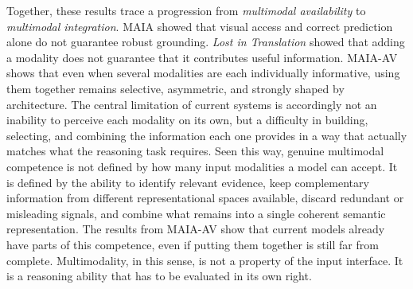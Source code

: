 Together, these results trace a progression from \textit{multimodal availability} to \textit{multimodal integration}. MAIA showed that visual access and correct prediction alone do not guarantee robust grounding. \textit{Lost in Translation} showed that adding a modality does not guarantee that it contributes useful information. MAIA-AV shows that even when several modalities are each individually informative, using them together remains selective, asymmetric, and strongly shaped by architecture. The central limitation of current systems is accordingly not an inability to perceive each modality on its own, but a difficulty in building, selecting, and combining the information each one provides in a way that actually matches what the reasoning task requires.
Seen this way, genuine multimodal competence is not defined by how many input modalities a model can accept. It is defined by the ability to identify relevant evidence, keep complementary information from different representational spaces available, discard redundant or misleading signals, and combine what remains into a single coherent semantic representation. The results from MAIA-AV show that current models already have parts of this competence, even if putting them together is still far from complete. Multimodality, in this sense, is not a property of the input interface. It is a reasoning ability that has to be evaluated in its own right.
